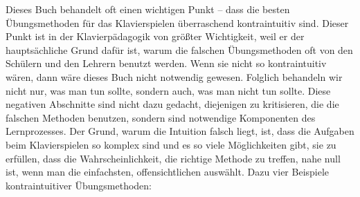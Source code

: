 Dieses Buch behandelt oft einen wichtigen Punkt -- dass die besten Übungsmethoden für das Klavierspielen überraschend kontraintuitiv sind.
Dieser Punkt ist in der Klavierpädagogik von größter Wichtigkeit, weil er der hauptsächliche Grund dafür ist, warum die falschen Übungsmethoden oft von den Schülern und den Lehrern benutzt werden.
Wenn sie nicht so kontraintuitiv wären, dann wäre dieses Buch nicht notwendig gewesen.
Folglich behandeln wir nicht nur, was man tun sollte, sondern auch, was man nicht tun sollte.
Diese negativen Abschnitte sind nicht dazu gedacht, diejenigen zu kritisieren, die die falschen Methoden benutzen, sondern sind notwendige Komponenten des Lernprozesses.
Der Grund, warum die Intuition falsch liegt, ist, dass die Aufgaben beim Klavierspielen so komplex sind und es so viele Möglichkeiten gibt, sie zu erfüllen, dass die Wahrscheinlichkeit, die richtige Methode zu treffen, nahe null ist, wenn man die einfachsten, offensichtlichen auswählt.
Dazu vier Beispiele kontraintuitiver Übungsmethoden:

